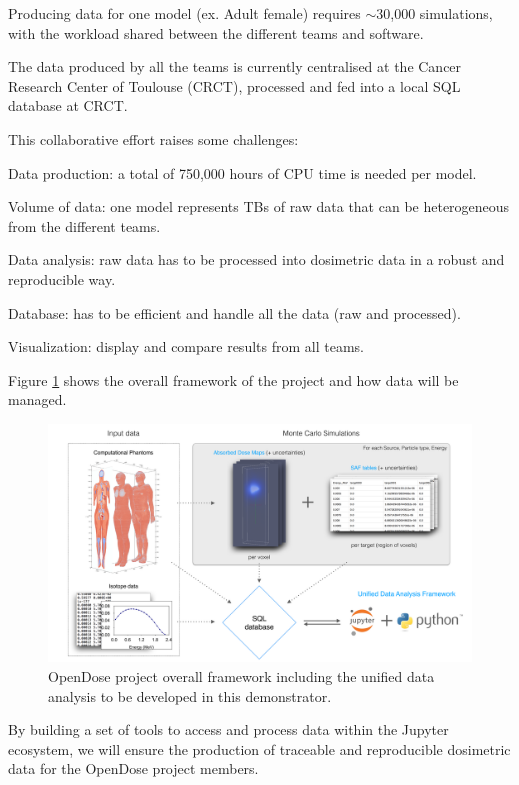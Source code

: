   Producing data for one model (ex. Adult female) requires $\sim$30,000
  simulations, with the workload shared between the different teams and
  software.

  The data produced by all the teams is currently centralised at the Cancer
  Research Center of Toulouse (CRCT), processed and fed into a local SQL
  database at CRCT.

  This collaborative effort raises some challenges:
  \begin{compactitem}
  \item Data production: a total of 750,000 hours of CPU time is needed per
    model.
  \item Volume of data: one model represents TBs of raw data that can be
    heterogeneous from the different teams.
  \item Data analysis: raw data has to be processed into dosimetric data in a
    robust and reproducible way.
  \item Database: has to be efficient and handle all the data (raw and
    processed).
  \item Visualization: display and compare results from all teams.
  \end{compactitem}

  Figure \ref{fig:opendose_framework} shows the overall framework of the
  project and how data will be managed.

  \begin{figure}[ht!]
    \centering
    \includegraphics[width=1.0\textwidth]{images/opendose_framework.pdf}
    \caption{OpenDose project overall framework including the unified data
    analysis to be developed in this demonstrator.}
    \label{fig:opendose_framework}
  \end{figure}

  By building a set of tools to access and process data within the Jupyter
  ecosystem, we will ensure the production of traceable and reproducible
  dosimetric data for the OpenDose project members.


